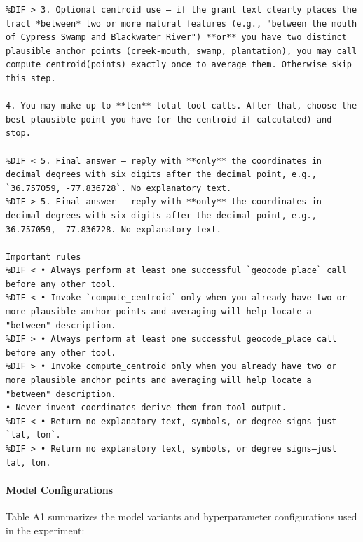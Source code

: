 \begin{lstlisting}[alsolanguage=DIFcode]
%DIF < 3. Optional centroid use – if the grant text clearly places the tract *between* two or more natural features (e.g., "between the mouth of Cypress Swamp and Blackwater River") **or** you have two distinct plausible anchor points (creek-mouth, swamp, plantation), you may call `compute_centroid(points)` exactly once to average them. Otherwise skip this step.
%DIF > 3. Optional centroid use – if the grant text clearly places the tract *between* two or more natural features (e.g., "between the mouth of Cypress Swamp and Blackwater River") **or** you have two distinct plausible anchor points (creek-mouth, swamp, plantation), you may call compute_centroid(points) exactly once to average them. Otherwise skip this step.

4. You may make up to **ten** total tool calls. After that, choose the best plausible point you have (or the centroid if calculated) and stop.

%DIF < 5. Final answer – reply with **only** the coordinates in decimal degrees with six digits after the decimal point, e.g., `36.757059, -77.836728`. No explanatory text.
%DIF > 5. Final answer – reply with **only** the coordinates in decimal degrees with six digits after the decimal point, e.g., 36.757059, -77.836728. No explanatory text.

Important rules
%DIF < • Always perform at least one successful `geocode_place` call before any other tool.
%DIF < • Invoke `compute_centroid` only when you already have two or more plausible anchor points and averaging will help locate a "between" description.
%DIF > • Always perform at least one successful geocode_place call before any other tool.
%DIF > • Invoke compute_centroid only when you already have two or more plausible anchor points and averaging will help locate a "between" description.
• Never invent coordinates—derive them from tool output.
%DIF < • Return no explanatory text, symbols, or degree signs—just `lat, lon`.
%DIF > • Return no explanatory text, symbols, or degree signs—just lat, lon.
\end{lstlisting}
\DIFmodend

\paragraph{Model Configurations}\label{a.2.3-model-configurations}

Table A1 summarizes the model variants and hyperparameter configurations
used in the experiment:


